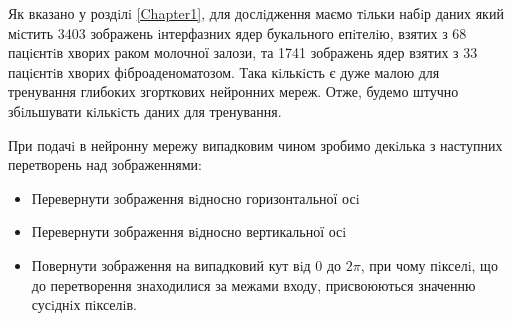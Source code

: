 Як вказано у роздiлi \ref{Chapter1}, для дослiдження маємо тiльки набiр даних який мiстить 3403 зображень iнтерфазних ядер букального епiтелiю, взятих з 68 пацiєнтiв хворих раком молочної залози, та 1741 зображень ядер взятих з 33 пацiєнтiв хворих фiброаденоматозом. Така кiлькiсть є дуже малою для тренування глибоких згорткових нейронних мереж. Отже, будемо штучно збiльшувати кiлькiсть даних для тренування.  

При подачi в нейронну мережу випадковим чином зробимо декiлька з наступних перетворень над зображеннями:
\begin{itemize}
\item Перевернути зображення вiдносно горизонтальної осi
\item Перевернути зображення вiдносно вертикальної осi
\item Повернути зображення на випадковий кут вiд \(0\) до \(2\pi\), при чому пiкселi, що до перетворення знаходилися за межами входу, присвоюються значенню сусiднiх пiкселiв.
\end{itemize}

